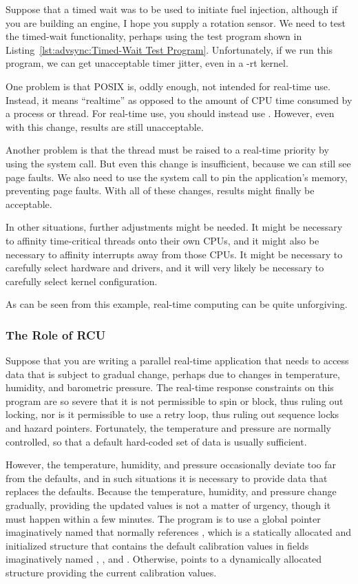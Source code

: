 Suppose that a timed wait was to be used to initiate fuel injection,
although if you are building an engine, I hope you supply a rotation
sensor.
We need to test the timed-wait functionality, perhaps using the test program
shown in
Listing~\ref{lst:advsync:Timed-Wait Test Program}.
Unfortunately, if we run this program, we can get unacceptable timer
jitter, even in a -rt kernel.

One problem is that POSIX  is, oddly enough, not intended
for real-time use.
Instead, it means ``realtime'' as opposed to the amount of CPU time
consumed by a process or thread.
For real-time use, you should instead use .
However, even with this change, results are still unacceptable.

Another problem is that the thread must be raised to a real-time
priority by using the  system call.
But even this change is insufficient, because we can still see
page faults.
We also need to use the  system call to pin the
application's memory, preventing page faults.
With all of these changes, results might finally be acceptable.

In other situations, further adjustments might be needed.
It might be necessary to affinity time-critical threads onto their
own CPUs, and it might also be necessary to affinity interrupts
away from those CPUs.
It might be necessary to carefully select hardware and drivers,
and it will very likely be necessary to carefully select kernel
configuration.

As can be seen from this example, real-time computing can be quite
unforgiving.

\subsubsection{The Role of RCU}
\label{sec:advsync:The Role of RCU}

Suppose that you are writing a parallel real-time application that needs
to access
data that is subject to gradual change, perhaps due to changes in
temperature, humidity, and barometric pressure.
The real-time response constraints on this program are so severe that
it is not permissible to spin or block, thus ruling out locking,
nor is it permissible to use a retry loop, thus ruling out sequence locks
and hazard pointers.
Fortunately, the temperature and pressure are normally controlled,
so that a default hard-coded set of data is usually sufficient.

However, the temperature, humidity, and pressure occasionally deviate too far
from the defaults, and in such situations it is necessary to provide
data that replaces the defaults.
Because the temperature, humidity, and pressure change gradually,
providing the updated values is not a matter of urgency, though
it must happen within a few minutes.
The program is to use a global pointer imaginatively named 
that normally references , which is a statically allocated
and initialized structure that contains the default calibration values
in fields imaginatively named , , and .
Otherwise,  points to a dynamically allocated
structure providing the current calibration values.

